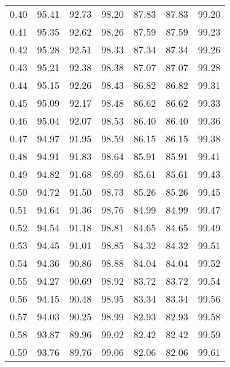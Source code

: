 \begin{tabular}{|c|c|c|c|c|c|c|}
      0.40 &     95.41 &     92.73 &      98.20 &   87.83 &      87.83 &         99.20 \\
      0.41 &     95.35 &     92.62 &      98.26 &   87.59 &      87.59 &         99.23 \\
      0.42 &     95.28 &     92.51 &      98.33 &   87.34 &      87.34 &         99.26 \\
      0.43 &     95.21 &     92.38 &      98.38 &   87.07 &      87.07 &         99.28 \\
      0.44 &     95.15 &     92.26 &      98.43 &   86.82 &      86.82 &         99.31 \\
      0.45 &     95.09 &     92.17 &      98.48 &   86.62 &      86.62 &         99.33 \\
      0.46 &     95.04 &     92.07 &      98.53 &   86.40 &      86.40 &         99.36 \\
      0.47 &     94.97 &     91.95 &      98.59 &   86.15 &      86.15 &         99.38 \\
      0.48 &     94.91 &     91.83 &      98.64 &   85.91 &      85.91 &         99.41 \\
      0.49 &     94.82 &     91.68 &      98.69 &   85.61 &      85.61 &         99.43 \\
      0.50 &     94.72 &     91.50 &      98.73 &   85.26 &      85.26 &         99.45 \\
      0.51 &     94.64 &     91.36 &      98.76 &   84.99 &      84.99 &         99.47 \\
      0.52 &     94.54 &     91.18 &      98.81 &   84.65 &      84.65 &         99.49 \\
      0.53 &     94.45 &     91.01 &      98.85 &   84.32 &      84.32 &         99.51 \\
      0.54 &     94.36 &     90.86 &      98.88 &   84.04 &      84.04 &         99.52 \\
      0.55 &     94.27 &     90.69 &      98.92 &   83.72 &      83.72 &         99.54 \\
      0.56 &     94.15 &     90.48 &      98.95 &   83.34 &      83.34 &         99.56 \\
      0.57 &     94.03 &     90.25 &      98.99 &   82.93 &      82.93 &         99.58 \\
      0.58 &     93.87 &     89.96 &      99.02 &   82.42 &      82.42 &         99.59 \\
      0.59 &     93.76 &     89.76 &      99.06 &   82.06 &      82.06 &         99.61 \\

\end{tabular}
